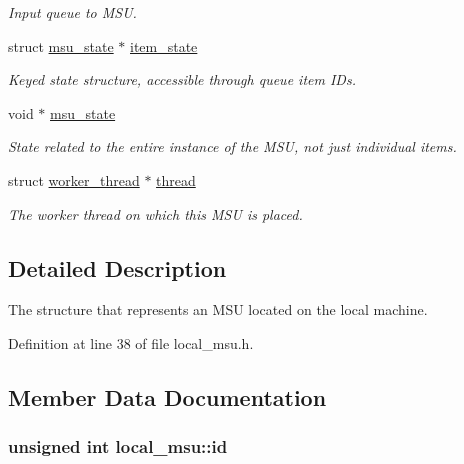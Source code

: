 \begin{DoxyCompactItemize}
\begin{DoxyCompactList}\small\item\em Input queue to M\-S\-U. \end{DoxyCompactList}\item 
struct \hyperlink{structmsu__state}{msu\-\_\-state} $\ast$ \hyperlink{structlocal__msu_a1f36b6678f46ffb35e60a8fd4a99a862}{item\-\_\-state}
\begin{DoxyCompactList}\small\item\em Keyed state structure, accessible through queue item I\-Ds. \end{DoxyCompactList}\item 
void $\ast$ \hyperlink{structlocal__msu_a4b540cc46b0cc35e4e7684f2d6af7c41}{msu\-\_\-state}
\begin{DoxyCompactList}\small\item\em State related to the entire instance of the M\-S\-U, not just individual items. \end{DoxyCompactList}\item 
struct \hyperlink{structworker__thread}{worker\-\_\-thread} $\ast$ \hyperlink{structlocal__msu_a8f2b8ca820e060261f888b3bcb01d222}{thread}
\begin{DoxyCompactList}\small\item\em The worker thread on which this M\-S\-U is placed. \end{DoxyCompactList}\end{DoxyCompactItemize}


\subsection{Detailed Description}
The structure that represents an M\-S\-U located on the local machine. 

Definition at line 38 of file local\-\_\-msu.\-h.



\subsection{Member Data Documentation}
\hypertarget{structlocal__msu_a1ca7fa0ae8f056072f5e92b895b7be1e}{
\subsubsection[{id}]{\setlength{\rightskip}{0pt plus 5cm}unsigned int local\-\_\-msu\-::id}}\label{structlocal__msu_a1ca7fa0ae8f056072f5e92b895b7be1e}


